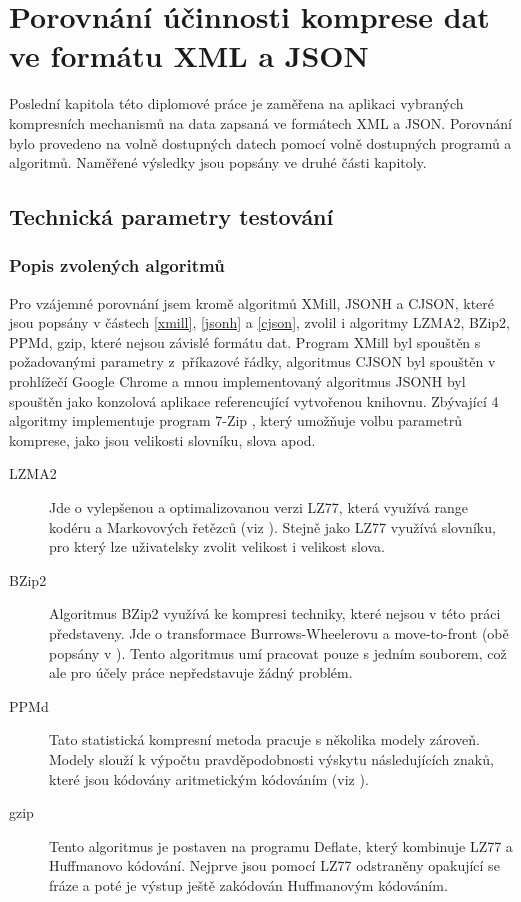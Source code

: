 \chapter{Porovnání účinnosti komprese dat ve formátu XML a JSON}
\label{kapitolaPorovnaniUcinnosti}
Poslední kapitola této diplomové práce je zaměřena na aplikaci vybraných kompresních mechanismů na data zapsaná ve formátech XML a JSON. Porovnání bylo provedeno na volně dostupných datech pomocí volně dostupných programů a algoritmů. Naměřené výsledky jsou popsány ve druhé části kapitoly.

\section{Technická parametry testování}

\subsection{Popis zvolených algoritmů}
Pro vzájemné porovnání jsem kromě algoritmů XMill, JSONH a CJSON, které jsou popsány v částech \ref{xmill}, \ref{jsonh} a \ref{cjson}, zvolil i algoritmy LZMA2, BZip2, PPMd, gzip, které nejsou závislé formátu dat. Program XMill byl spouštěn s požadovanými parametry z~příkazové řádky, algoritmus CJSON byl spouštěn v prohlížečí Google Chrome a mnou implementovaný algoritmus JSONH byl spouštěn jako konzolová aplikace referencující vytvořenou knihovnu. Zbývající 4 algoritmy implementuje program 7-Zip \cite{7zip}, který umožňuje volbu parametrů komprese, jako jsou velikosti slovníku, slova apod.

\begin{description}
\item[LZMA2] Jde o vylepšenou a optimalizovanou verzi LZ77, která využívá range kodéru a Markovových řetězců (viz \cite{introductionToDataCompression}). Stejně jako LZ77 využívá slovníku, pro který lze uživatelsky zvolit velikost i velikost slova. %
\item[BZip2] Algoritmus BZip2 využívá ke kompresi techniky, které nejsou v této práci představeny. Jde o transformace Burrows-Wheelerovu a move-to-front (obě popsány v \cite{introductionToDataCompression}). Tento algoritmus umí pracovat pouze s jedním souborem, což ale pro účely práce nepředstavuje žádný problém.
\item[PPMd] Tato statistická kompresní metoda pracuje s několika modely zároveň. Modely slouží k výpočtu pravděpodobnosti výskytu následujících znaků, které jsou kódovány aritmetickým kódováním (viz \cite{introductionToDataCompression}).
\item[gzip] Tento algoritmus je postaven na programu Deflate, který kombinuje LZ77 a Huffmanovo kódování. Nejprve jsou pomocí LZ77 odstraněny opakující se fráze a poté je výstup ještě zakódován Huffmanovým kódováním. 
\end{description}

